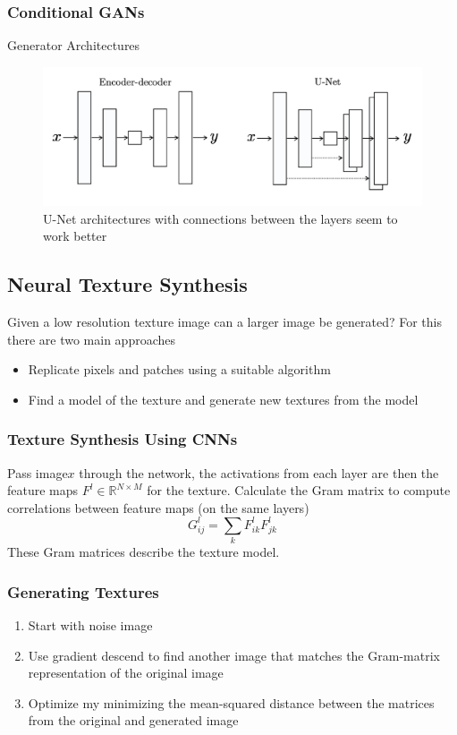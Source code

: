 \documentclass[x11names,11pt,a4paper]{article}
\theoremstyle{definition}
\newcommand*\R{\mathbb{R}}
\begin{document}
\subsubsection{Conditional GANs}
Generator Architectures
\begin{figure}[H]
	\centering
	\includegraphics[width=0.7\linewidth]{img/conditional_GAN_generator_architectures}
	\caption{U-Net architectures with connections between the layers seem to work better}
	\label{fig:conditionalgangeneratorarchitectures}
\end{figure}

\subsection{Neural Texture Synthesis}
Given a low resolution texture image can a larger image be generated? For this there are two main approaches
\begin{itemize}[label=-]
	\item Replicate pixels and patches using a suitable algorithm
	\item Find a model of the texture and generate new textures from the model
\end{itemize}

\subsubsection{Texture Synthesis Using CNNs}
Pass image$x$ through the network, the activations from each layer are then the feature maps $F^l \in \R^{N\times M}$ for the texture. Calculate the Gram matrix to compute correlations between feature maps (on the same layers)
\begin{equation*}
	G_{ij}^l = \sum_{k} F_{ik}^l F_{jk}^l
\end{equation*}
These Gram matrices describe the texture model.

\subsubsection{Generating Textures}
\begin{enumerate}[itemsep=0em]
	\item Start with noise image
	\item Use gradient descend to find another image that matches the Gram-matrix representation of the original image
	\item Optimize my minimizing the mean-squared distance between the matrices from the original and generated image
\end{enumerate}
\end{document}
